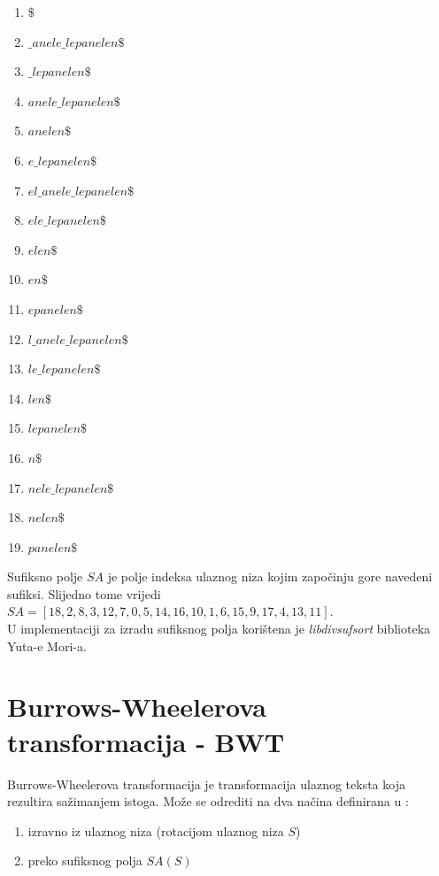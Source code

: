 \documentclass[times, utf8, seminar, numeric]{fer}
\begin{document}
\begin{center}
	\begin{enumerate}
		\setlength\itemsep{-0.8em}
		\item \textbf{$\$$}
		\item \textbf{$\_anele\_lepanelen\$$}
		\item \textbf{$\_lepanelen\$$}
		\item \textbf{$anele\_lepanelen\$$}
		\item \textbf{$anelen\$$}
		\item \textbf{$e\_lepanelen\$$}
		\item \textbf{$el\_anele\_lepanelen\$$}
		\item \textbf{$ele\_lepanelen\$$}
		\item \textbf{$elen\$$}
		\item \textbf{$en\$$}
		\item \textbf{$epanelen\$$}
		\item \textbf{$l\_anele\_lepanelen\$$}
		\item \textbf{$le\_lepanelen\$$}
		\item \textbf{$len\$$}
		\item \textbf{$lepanelen\$$}
		\item \textbf{$n\$$}
		\item \textbf{$nele\_lepanelen\$$}
		\item \textbf{$nelen\$$}
		\item \textbf{$panelen\$$}	
	\end{enumerate} 
\end{center}
Sufiksno polje $SA$ je polje indeksa ulaznog niza kojim započinju gore navedeni sufiksi. Slijedno tome vrijedi 
$SA = [18, 2, 8, 3, 12, 7, 0, 5, 14, 16, 10, 1, 6, 15, 9, 17, 4, 13, 11]$.\cite{Beller2011} \\
U implementaciji za izradu sufiksnog polja korištena je \textit{libdivsufsort} biblioteka Yuta-e Mori-a.

\section {Burrows-Wheelerova transformacija - BWT}
Burrows-Wheelerova transformacija je transformacija ulaznog teksta koja rezultira sažimanjem istoga. Može se odrediti na dva načina definirana u \cite{domazet_sikic_skripta}: 
 
\begin{center}
	\begin{enumerate}
		\setlength\itemsep{-0.8em}
		\item {izravno iz ulaznog niza (rotacijom ulaznog niza $S$)}
		\item {preko sufiksnog polja $SA(S)$}

	\end{enumerate} 
\end{center}
\end{document}

